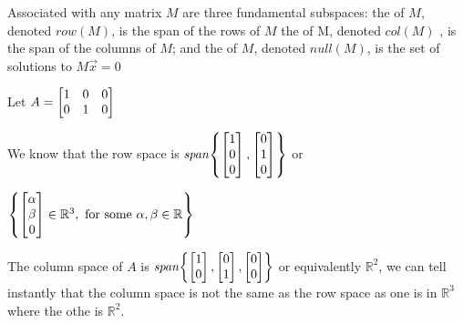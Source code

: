 \documentclass[11pt]{book}
\begin{document}
\begin{defn}\label{defn:fundamental_subspaces}
    Associated with any matrix $M$ are three fundamental subspaces: the  of $M$,  denoted $row(M)$, is the span of the rows of $M$ the  of M, denoted $col(M)$ , is the span of the columns of $M$; and the  of $M$, denoted $\mathit{null} {\left( M \right)} $,  is the set of solutions to $M\vec{x} = 0$ 
\end{defn}

Let $A = \begin{bmatrix} 1 & 0 & 0 \\ 0 & 1 & 0 \end{bmatrix}$ 

\begin{eg}
    We know that the row space is $\mathit{span} {\left\{ \begin{bmatrix} 1 \\ 0 \\ 0 \end{bmatrix}, \begin{bmatrix} 0 \\ 1 \\ 0 \end{bmatrix} \right\}} $ or
    
    $\left\{ \begin{bmatrix} \alpha \\ \beta \\ 0 \end{bmatrix} \in \mathbb{R}^3, \text{ for some } \alpha, \beta \in \mathbb{R} \right\}$  
\end{eg}

\begin{eg}
    The column space of $A$ is $\mathit{span} {\left\{ \begin{bmatrix} 1 \\ 0 \end{bmatrix}, \begin{bmatrix} 0 \\ 1 \end{bmatrix}, \begin{bmatrix} 0 \\ 0 \end{bmatrix} \right\}} $ or equivalently $\mathbb{R}^2$, we can tell instantly that the column space is not the same as the row space as one is in $\mathbb{R}^{3}$ where the othe is $\mathbb{R}^2$. 
\end{eg}
\end{document}
